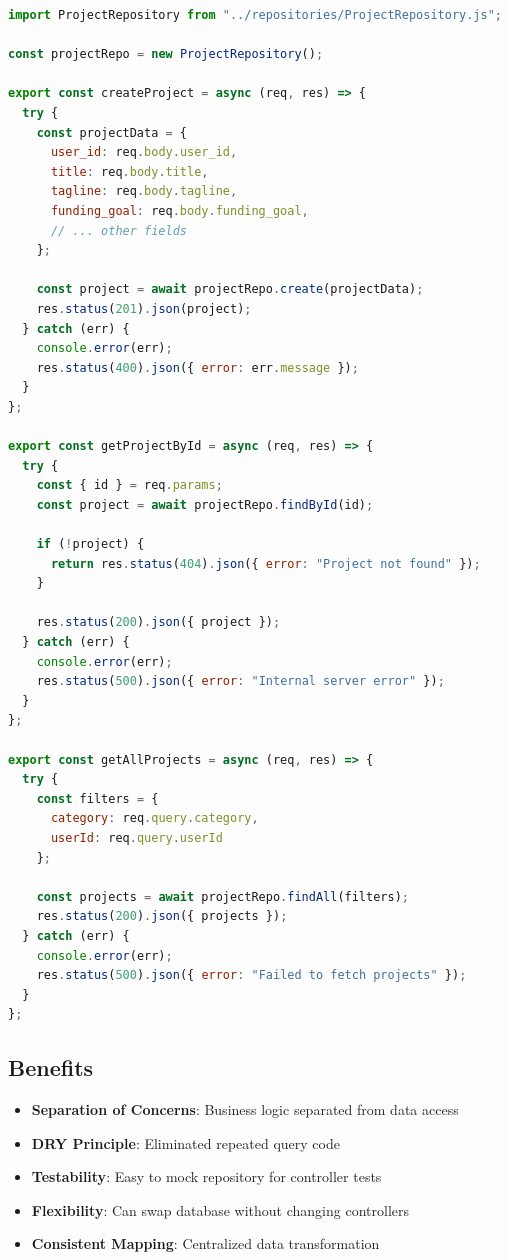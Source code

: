 \documentclass[12pt,a4paper]{article}
\begin{document}
\begin{lstlisting}[language=JavaScript, caption=Refactored projectController.js]
import ProjectRepository from "../repositories/ProjectRepository.js";

const projectRepo = new ProjectRepository();

export const createProject = async (req, res) => {
  try {
    const projectData = {
      user_id: req.body.user_id,
      title: req.body.title,
      tagline: req.body.tagline,
      funding_goal: req.body.funding_goal,
      // ... other fields
    };
    
    const project = await projectRepo.create(projectData);
    res.status(201).json(project);
  } catch (err) {
    console.error(err);
    res.status(400).json({ error: err.message });
  }
};

export const getProjectById = async (req, res) => {
  try {
    const { id } = req.params;
    const project = await projectRepo.findById(id);
    
    if (!project) {
      return res.status(404).json({ error: "Project not found" });
    }
    
    res.status(200).json({ project });
  } catch (err) {
    console.error(err);
    res.status(500).json({ error: "Internal server error" });
  }
};

export const getAllProjects = async (req, res) => {
  try {
    const filters = {
      category: req.query.category,
      userId: req.query.userId
    };
    
    const projects = await projectRepo.findAll(filters);
    res.status(200).json({ projects });
  } catch (err) {
    console.error(err);
    res.status(500).json({ error: "Failed to fetch projects" });
  }
};
\end{lstlisting}

\subsection{Benefits}
\begin{itemize}
    \item \textbf{Separation of Concerns}: Business logic separated from data access
    \item \textbf{DRY Principle}: Eliminated repeated query code
    \item \textbf{Testability}: Easy to mock repository for controller tests
    \item \textbf{Flexibility}: Can swap database without changing controllers
    \item \textbf{Consistent Mapping}: Centralized data transformation
\end{itemize}
\end{document}

